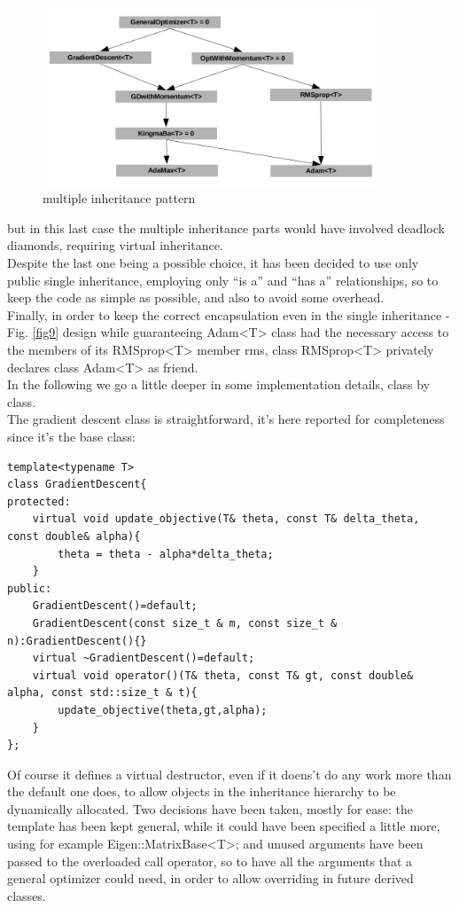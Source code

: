 \documentclass[12pt, a4paper]{report}
\theoremstyle{definition}
\begin{document}
\begin{figure}[H]
	\centering
	\includegraphics[width=0.9\textwidth]{img/classes0}
	\caption{multiple inheritance pattern}
\end{figure}
\noindent but in this last case the multiple inheritance parts would have involved deadlock diamonds, requiring virtual inheritance.\\
Despite the last one being a possible choice, it has been decided to use only public single inheritance, employing only ``is a'' and ``has a'' relationships, so to keep the code as simple as possible, and also to avoid some overhead.\\
Finally, in order to keep the correct encapsulation even in the single inheritance - Fig. \ref{fig9} design while guaranteeing {\ttfamily Adam<T>} class had the necessary access to the members of its {\ttfamily RMSprop<T>} member {\ttfamily rms}, class {\ttfamily RMSprop<T>} privately declares class {\ttfamily Adam<T>} as friend.\\
\newline \noindent In the following we go a little deeper in some implementation details, class by class.\\
The gradient descent class is straightforward, it's here reported for completeness since it's the base class:
\begin{lstlisting}[frame=single]
template<typename T>
class GradientDescent{
protected:
	virtual void update_objective(T& theta, const T& delta_theta, const double& alpha){
		theta = theta - alpha*delta_theta;  
	}
public:
	GradientDescent()=default;
	GradientDescent(const size_t & m, const size_t & n):GradientDescent(){}
	virtual ~GradientDescent()=default;
	virtual void operator()(T& theta, const T& gt, const double& alpha, const std::size_t & t){
		update_objective(theta,gt,alpha);
	}
};
\end{lstlisting}
\noindent Of course it defines a virtual destructor, even if it doens't do any work more than the default one does, to allow objects in the inheritance hierarchy to be dynamically allocated. Two decisions have been taken, mostly for ease: the template has been kept general, while it could have been specified a little more, using for example {\ttfamily Eigen::MatrixBase<T>}; and unused arguments have been passed to the overloaded call operator, so to have all the arguments that a general optimizer could need, in order to allow overriding in future derived classes.\\
\end{document}
